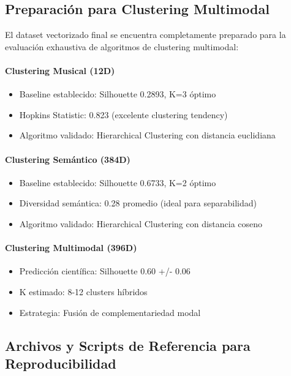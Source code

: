 \documentclass[12pt,a4paper]{report}
\begin{document}
\subsection{Preparación para Clustering Multimodal}

El dataset vectorizado final se encuentra completamente preparado para la evaluación exhaustiva de algoritmos de clustering multimodal:

\paragraph{Clustering Musical (12D)}
\begin{itemize}
    \item Baseline establecido: Silhouette 0.2893, K=3 óptimo
    \item Hopkins Statistic: 0.823 (excelente clustering tendency)
    \item Algoritmo validado: Hierarchical Clustering con distancia euclidiana
\end{itemize}

\paragraph{Clustering Semántico (384D)}
\begin{itemize}
    \item Baseline establecido: Silhouette 0.6733, K=2 óptimo
    \item Diversidad semántica: 0.28 promedio (ideal para separabilidad)
    \item Algoritmo validado: Hierarchical Clustering con distancia coseno
\end{itemize}

\paragraph{Clustering Multimodal (396D)}
\begin{itemize}
    \item Predicción científica: Silhouette 0.60 +/- 0.06
    \item K estimado: 8-12 clusters híbridos
    \item Estrategia: Fusión de complementariedad modal
\end{itemize}

\subsection{Archivos y Scripts de Referencia para Reproducibilidad}
\end{document}
